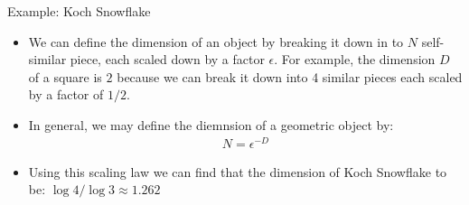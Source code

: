 \documentclass[10pt,xcolor={table,dvipsnames},t]{beamer}
\begin{document}
\begin{frame}{Example: Koch Snowflake}
  \begin{itemize}
    \item We can define the dimension of an object by breaking it down in to $N$ self-similar piece, each scaled down by a factor $\epsilon$. For example, the dimension $D$ of a square is $2$ because we can break it down into 4 similar pieces each scaled by a factor of $1/2$. \item In general, we may define the diemnsion of a geometric object by:
    \begin{align*}
      N = \epsilon^{-D}
    \end{align*}
    \item Using this scaling law we can find that the dimension of Koch Snowflake to be: $\log 4/\log 3 \approx 1.262$
  \end{itemize}
\end{frame}
\end{document}
